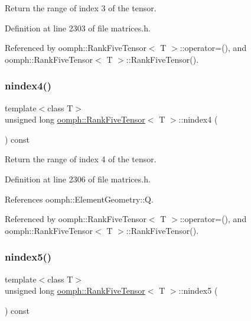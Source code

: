 Return the range of index 3 of the tensor. 



Definition at line 2303 of file matrices.\+h.



Referenced by oomph\+::\+Rank\+Five\+Tensor$<$ T $>$\+::operator=(), and oomph\+::\+Rank\+Five\+Tensor$<$ T $>$\+::\+Rank\+Five\+Tensor().

\mbox{\label{classoomph_1_1RankFiveTensor_a2f59dd13534545f9e2641dafee86bc27}} 
\subsubsection{\texorpdfstring{nindex4()}{nindex4()}}
{\footnotesize\ttfamily template$<$class T$>$ \\
unsigned long \hyperlink{classoomph_1_1RankFiveTensor}{oomph\+::\+Rank\+Five\+Tensor}$<$ T $>$\+::nindex4 (\begin{DoxyParamCaption}{ }\end{DoxyParamCaption}) const\hspace{0.3cm}{\ttfamily [inline]}}



Return the range of index 4 of the tensor. 



Definition at line 2306 of file matrices.\+h.



References oomph\+::\+Element\+Geometry\+::Q.



Referenced by oomph\+::\+Rank\+Five\+Tensor$<$ T $>$\+::operator=(), and oomph\+::\+Rank\+Five\+Tensor$<$ T $>$\+::\+Rank\+Five\+Tensor().

\mbox{\label{classoomph_1_1RankFiveTensor_aa880f750e9d2e2bf5ec5c41ad3241568}} 
\subsubsection{\texorpdfstring{nindex5()}{nindex5()}}
{\footnotesize\ttfamily template$<$class T$>$ \\
unsigned long \hyperlink{classoomph_1_1RankFiveTensor}{oomph\+::\+Rank\+Five\+Tensor}$<$ T $>$\+::nindex5 (\begin{DoxyParamCaption}{ }\end{DoxyParamCaption}) const\hspace{0.3cm}{\ttfamily [inline]}}



